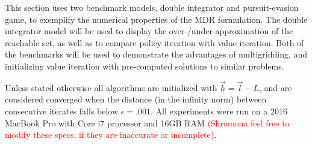 This section uses two benchmark models, double integrator and pursuit-evasion game, to exemplify the numerical properties of the MDR formulation. The double integrator model will be used to display the over-/under-approximation of the reachable set, as well as to compare policy iteration with value iteration. Both of the benchmarks will be used to demonstrate the advantages of multigridding, and initializing value iteration with pre-computed solutions to similar problems. 

Unless stated otherwise all algorithms are initialized with $\vec{h}=\vec{l}-L$, and are considered converged when the distance (in the infinity norm) between consecutive iterates falls below $\epsilon =.001$. All experiments were run on a 2016 MacBook Pro with Core i7 processor and 16GB RAM \textcolor{red}{(Shromona feel free to modify these specs, if they are inaccurate or incomplete)}.




